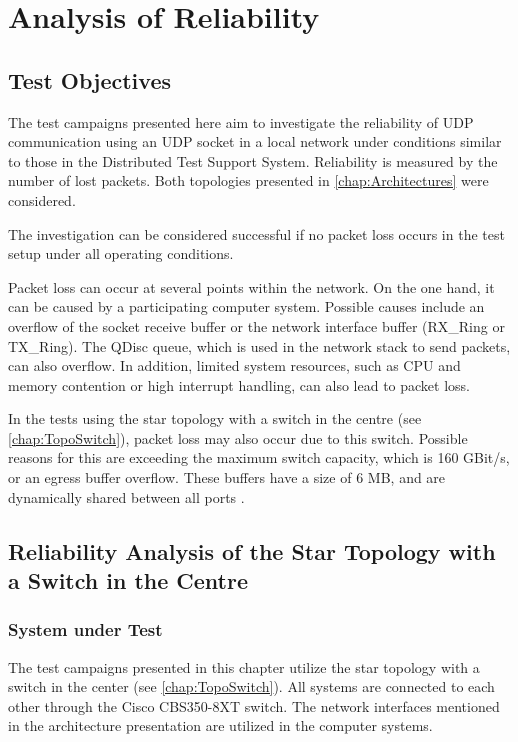 \chapter{Analysis of Reliability}

\section{Test Objectives}

The test campaigns presented here aim to investigate the reliability of UDP communication using an UDP socket in a local network under conditions similar to those in the Distributed Test Support System. Reliability is measured by the number of lost packets. Both topologies presented in \ref{chap:Architectures} were considered.

The investigation can be considered successful if no packet loss occurs in the test setup under all operating conditions.

Packet loss can occur at several points within the network. On the one hand, it can be caused by a participating computer system. Possible causes include an overflow of the socket receive buffer or the network interface buffer (RX\_Ring or TX\_Ring). The QDisc queue, which is used in the network stack to send packets, can also overflow. In addition, limited system resources, such as CPU and memory contention or high interrupt handling, can also lead to packet loss.

In the tests using the star topology with a switch in the centre (see \ref{chap:TopoSwitch}), packet loss may also occur due to this switch. Possible reasons for this are exceeding the maximum switch capacity, which is 160 GBit/s, or an egress buffer overflow. These buffers have a size of 6 MB, and are dynamically shared between all ports \cite{setup09}.

\section{Reliability Analysis of the Star Topology with a Switch in the Centre} \label{chap:switchtest}

\subsection{System under Test}
The test campaigns presented in this chapter utilize the star topology with a switch in the center (see \ref{chap:TopoSwitch}). All systems are connected to each other through the Cisco CBS350-8XT switch. The network interfaces mentioned in the architecture presentation are utilized in the computer systems.

